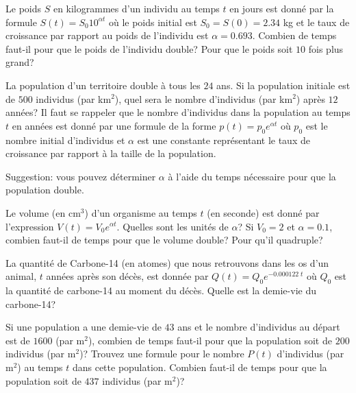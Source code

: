 \begin{question}
Le poids $S$ en kilogrammes d'un individu au temps $t$ en jours est
donné par la formule $\displaystyle S(t) = S_0 10^{\alpha t}$ où le
poids initial est $S_0 = S(0) = 2.34$ kg et le taux de croissance
par rapport au poids de l'individu est $\alpha = 0.693$.  Combien de temps
faut-il pour que le poids de l'individu double?  Pour que le poids
soit $10$ fois plus grand?
\label{2Q27}
\end{question}

\begin{question}
La population d'un territoire double à tous les $24$ ans.  Si la
population initiale est de $500$ individus (par km$^2$), quel sera le
nombre d'individus (par km$^2$) après $12$ années? Il faut se rappeler
que le nombre d'individus dans la population au temps $t$ en années
est donné par une formule de la forme
$\displaystyle p(t) = p_0 e^{\alpha t}$ où $p_0$ est le nombre initial
d'individus et $\alpha$ est une constante représentant le taux de
croissance par rapport à la taille de la population.

Suggestion: vous pouvez déterminer $\alpha$ à l'aide du temps
nécessaire pour que la population double.
\label{2Q28}
\end{question}

\begin{question}
Le volume (en cm$^3$) d'un organisme au temps $t$ (en seconde) est
donné par l'expression $V(t) = V_0 e^{\alpha t}$.  Quelles sont les
unités de $\alpha$?  Si $V_0 = 2$ et $\alpha = 0.1$, combien faut-il
de temps pour que le volume double?  Pour qu'il quadruple?
\label{2Q29}
\end{question}

\begin{question}
La quantité de Carbone-14 (en atomes) que nous retrouvons dans les os
d'un animal, $t$ années après son décès, est donnée par
$\displaystyle Q(t) = Q_0 e^{-0.000122\; t}$ où $Q_0$ est la quantité de
carbone-14 au moment du décès.  Quelle est la demie-vie du carbone-14?
\label{2Q30}
\end{question}

\begin{question}
Si une population a une demie-vie de $43$ ans et le nombre d'individus
au départ est de $1600$ (par m$^2$), combien de temps faut-il pour que
la population soit de $200$ individus (par m$^2$)?  Trouvez une
formule pour le nombre $P(t)$ d'individus (par m$^2$) au temps $t$
dans cette population.  Combien faut-il de temps pour que la
population soit de $437$ individus (par m$^2$)?
\label{2Q31}
\end{question}

